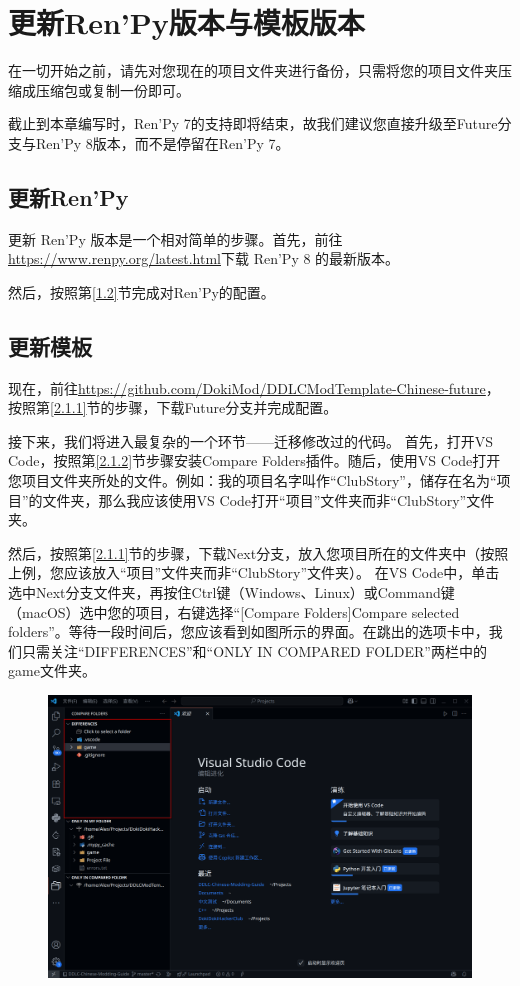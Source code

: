 \section{更新Ren'Py版本与模板版本}
在一切开始之前，请先对您现在的项目文件夹进行备份，只需将您的项目文件夹压缩成压缩包或复制一份即可。

\begin{Warning}
    截止到本章编写时，Ren'Py 7的支持即将结束，故我们建议您直接升级至Future分支与Ren'Py 8版本，而不是停留在Ren'Py 7。
\end{Warning}

\subsection{更新Ren'Py}
更新 Ren'Py 版本是一个相对简单的步骤。首先，前往\url{https://www.renpy.org/latest.html}下载 Ren'Py 8 的最新版本。

然后，按照第\ref{1.2}节完成对Ren'Py的配置。

\subsection{更新模板}
现在，前往\url{https://github.com/DokiMod/DDLCModTemplate-Chinese-future}，按照第\ref{2.1.1}节的步骤，下载Future分支并完成配置。

接下来，我们将进入最复杂的一个环节——迁移修改过的代码。
首先，打开VS Code，按照第\ref{2.1.2}节步骤安装Compare Folders插件。随后，使用VS Code打开您项目文件夹所处的文件。例如：我的项目名字叫作“ClubStory”，储存在名为“项目”的文件夹，那么我应该使用VS Code打开“项目”文件夹而非“ClubStory”文件夹。

然后，按照第\ref{2.1.1}节的步骤，下载Next分支，放入您项目所在的文件夹中（按照上例，您应该放入“项目”文件夹而非“ClubStory”文件夹）。
在VS Code中，单击选中Next分支文件夹，再按住Ctrl键（Windows、Linux）或Command键（macOS）选中您的项目，右键选择“[Compare Folders]Compare selected folders”。等待一段时间后，您应该看到如图所示的界面。在跳出的选项卡中，我们只需关注“DIFFERENCES”和“ONLY IN COMPARED FOLDER”两栏中的game文件夹。
\begin{figure}[htbp]
    \centering
    \includegraphics[scale=.2]{Pictures/7.1.2.1.png}
\end{figure}


